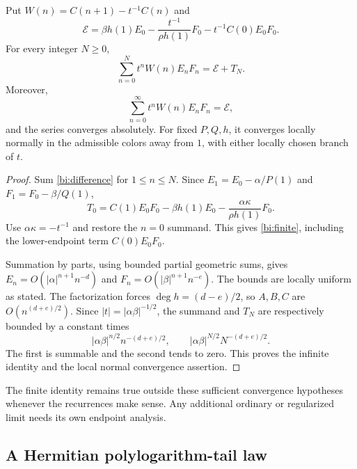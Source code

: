 \begin{theorem}
\label{bi:sum}
Put $W(n)=C(n+1)-t^{-1}C(n)$ and
\begin{equation}\label{bi:endpoint}
 \mathcal E=
 \beta h(1)E_0-\frac{t^{-1}}{\rho h(1)}F_0
                  -t^{-1}C(0)E_0F_0.
\end{equation}
For every integer $N\ge0$,
\begin{equation}\label{bi:finite}
 \sum_{n=0}^N t^n W(n)E_nF_n=\mathcal E+T_N.
\end{equation}
Moreover,
\begin{equation}\label{bi:infinite}
 \boxed{\displaystyle
 \sum_{n=0}^{\infty}t^n W(n)E_nF_n=\mathcal E,}
\end{equation}
and the series converges absolutely. For fixed $P,Q,h$, it converges
locally normally in the admissible colors away from $1$, with either
locally chosen branch of $t$.
\end{theorem}

\begin{proof}
Sum \eqref{bi:difference} for $1\le n\le N$. Since
$E_1=E_0-\alpha/P(1)$ and $F_1=F_0-\beta/Q(1)$,
\[
 T_0=C(1)E_0F_0-\beta h(1)E_0
                         -\frac{\alpha\kappa}{\rho h(1)}F_0.
\]
Use $\alpha\kappa=-t^{-1}$ and restore the $n=0$ summand.
This gives \eqref{bi:finite}, including the lower-endpoint term
$C(0)E_0F_0$.

Summation by parts, using bounded partial geometric sums, gives
$E_n=O(|\alpha|^{n+1}n^{-d})$ and
$F_n=O(|\beta|^{n+1}n^{-e})$. The bounds are locally uniform as
stated. The factorization forces $\deg h=(d-e)/2$, so $A,B,C$
are $O(n^{(d+e)/2})$. Since $|t|=|\alpha\beta|^{-1/2}$,
the summand and $T_N$ are respectively bounded by a constant times
\[
 |\alpha\beta|^{n/2}n^{-(d+e)/2},\qquad
 |\alpha\beta|^{N/2}N^{-(d+e)/2}.
\]
The first is summable and the second tends to zero. This proves the
infinite identity and the local normal convergence assertion.
\end{proof}

The finite identity remains true outside these sufficient convergence
hypotheses whenever the recurrences make sense. Any additional ordinary
or regularized limit needs its own endpoint analysis.

\subsection{A Hermitian polylogarithm-tail law}

